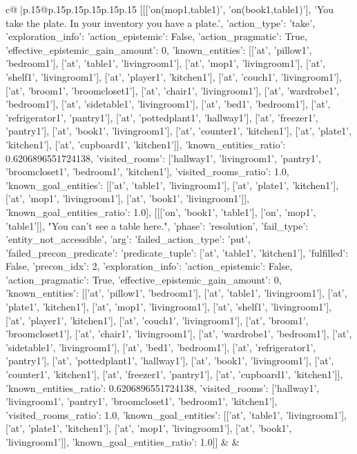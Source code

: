 \documentclass{article}
\begin{document}
{\begin{supertabular}{c@{$\;$}|p{.15\linewidth}@{}p{.15\linewidth}p{.15\linewidth}p{.15\linewidth}p{.15\linewidth}p{.15\linewidth}}
{{{	 [[['on(mop1,table1)', 'on(book1,table1)'], 'You take the plate. In your inventory you have a plate.', {'action_type': 'take', 'exploration_info': {'action_epistemic': False, 'action_pragmatic': True, 'effective_epistemic_gain_amount': 0, 'known_entities': [['at', 'pillow1', 'bedroom1'], ['at', 'table1', 'livingroom1'], ['at', 'mop1', 'livingroom1'], ['at', 'shelf1', 'livingroom1'], ['at', 'player1', 'kitchen1'], ['at', 'couch1', 'livingroom1'], ['at', 'broom1', 'broomcloset1'], ['at', 'chair1', 'livingroom1'], ['at', 'wardrobe1', 'bedroom1'], ['at', 'sidetable1', 'livingroom1'], ['at', 'bed1', 'bedroom1'], ['at', 'refrigerator1', 'pantry1'], ['at', 'pottedplant1', 'hallway1'], ['at', 'freezer1', 'pantry1'], ['at', 'book1', 'livingroom1'], ['at', 'counter1', 'kitchen1'], ['at', 'plate1', 'kitchen1'], ['at', 'cupboard1', 'kitchen1']], 'known_entities_ratio': 0.6206896551724138, 'visited_rooms': ['hallway1', 'livingroom1', 'pantry1', 'broomcloset1', 'bedroom1', 'kitchen1'], 'visited_rooms_ratio': 1.0, 'known_goal_entities': [['at', 'table1', 'livingroom1'], ['at', 'plate1', 'kitchen1'], ['at', 'mop1', 'livingroom1'], ['at', 'book1', 'livingroom1']], 'known_goal_entities_ratio': 1.0}}], [[['on', 'book1', 'table1'], ['on', 'mop1', 'table1']], "You can't see a table here.", {'phase': 'resolution', 'fail_type': 'entity_not_accessible', 'arg': {'failed_action_type': 'put', 'failed_precon_predicate': {'predicate_tuple': ['at', 'table1', 'kitchen1'], 'fulfilled': False, 'precon_idx': 2}}, 'exploration_info': {'action_epistemic': False, 'action_pragmatic': True, 'effective_epistemic_gain_amount': 0, 'known_entities': [['at', 'pillow1', 'bedroom1'], ['at', 'table1', 'livingroom1'], ['at', 'plate1', 'kitchen1'], ['at', 'mop1', 'livingroom1'], ['at', 'shelf1', 'livingroom1'], ['at', 'player1', 'kitchen1'], ['at', 'couch1', 'livingroom1'], ['at', 'broom1', 'broomcloset1'], ['at', 'chair1', 'livingroom1'], ['at', 'wardrobe1', 'bedroom1'], ['at', 'sidetable1', 'livingroom1'], ['at', 'bed1', 'bedroom1'], ['at', 'refrigerator1', 'pantry1'], ['at', 'pottedplant1', 'hallway1'], ['at', 'book1', 'livingroom1'], ['at', 'counter1', 'kitchen1'], ['at', 'freezer1', 'pantry1'], ['at', 'cupboard1', 'kitchen1']], 'known_entities_ratio': 0.6206896551724138, 'visited_rooms': ['hallway1', 'livingroom1', 'pantry1', 'broomcloset1', 'bedroom1', 'kitchen1'], 'visited_rooms_ratio': 1.0, 'known_goal_entities': [['at', 'table1', 'livingroom1'], ['at', 'plate1', 'kitchen1'], ['at', 'mop1', 'livingroom1'], ['at', 'book1', 'livingroom1']], 'known_goal_entities_ratio': 1.0}}]] 
	  } 
	   } 
	   } 
	 & & \\ 
 


\end{supertabular}}
\end{document}
